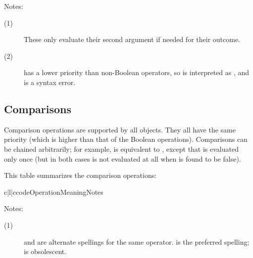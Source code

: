 \noindent
Notes:

\begin{description}

\item[(1)]
These only evaluate their second argument if needed for their outcome.

\item[(2)]
 has a lower priority than non-Boolean operators, so
 is interpreted as , and  is a syntax error.

\end{description}


\subsection{Comparisons \label{comparisons}}

Comparison operations are supported by all objects.  They all have the
same priority (which is higher than that of the Boolean operations).
Comparisons can be chained arbitrarily; for example,  is equivalent to , except that  is evaluated only once (but
in both cases  is not evaluated at all when  is found to be false).

This table summarizes the comparison operations:

\begin{tableiii}{c|l|c}{code}{Operation}{Meaning}{Notes}
\end{tableiii}
\opindex{==} %

\noindent
Notes:

\begin{description}

\item[(1)]
\code{<>} and \code{!=} are alternate spellings for the same operator.
\code{!=} is the preferred spelling; \code{<>} is obsolescent.

\end{description}

